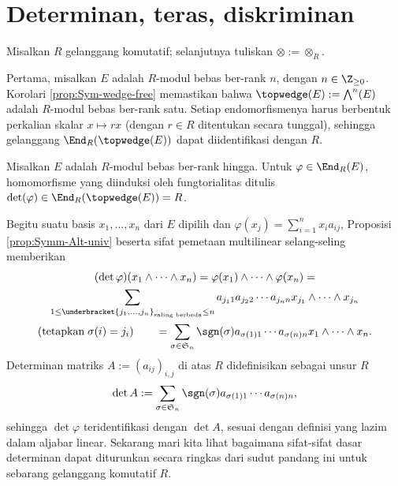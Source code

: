 \section{Determinan, teras, diskriminan}\label{sec:trace-norm-disc}
Misalkan $R$ gelanggang komutatif; selanjutnya tuliskan $\otimes := \otimes_R$.

Pertama, misalkan $E$ adalah $R$-modul bebas ber-rank $n$, dengan $n \in \Z_{\geq 0}$. Korolari \ref{prop:Sym-wedge-free} memastikan bahwa $\topwedge(E) := \bigwedge^n(E)$ adalah $R$-modul bebas ber-rank satu. Setiap endomorfismenya harus berbentuk perkalian skalar $x \mapsto rx$ (dengan $r \in R$ ditentukan secara tunggal), sehingga gelanggang $\End_R(\topwedge(E))$ dapat diidentifikasi dengan $R$. 
\begin{definition}\label{def:general-determinant} 
	Misalkan $E$ adalah $R$-modul bebas ber-rank hingga. Untuk $\varphi \in \End_R(E)$, homomorfisme yang diinduksi oleh fungtorialitas ditulis $\det(\varphi) \in \End_R(\topwedge(E)) = R$.
\end{definition}
Begitu suatu basis $x_1, \ldots, x_n$ dari $E$ dipilih dan $\varphi(x_j) = \sum_{i=1}^n x_i a_{ij}$, Proposisi \ref{prop:Symm-Alt-univ} beserta sifat pemetaan multilinear selang-seling memberikan
\begin{multline}
	(\det\varphi)(x_1 \wedge \cdots \wedge x_n) = \varphi(x_1) \wedge \cdots \wedge \varphi(x_n) = \\
	\sum_{1 \leq \underbracket{j_1, \ldots, j_n}_{\text{saling berbeda}} \leq n} a_{j_1 1} a_{j_2 2} \cdots a_{j_n n} x_{j_1} \wedge \cdots \wedge x_{j_n} \\
	\left( \text{tetapkan}\; \sigma(i) = j_i \right) \qquad = \sum_{\sigma \in \mathfrak{S}_n} \sgn(\sigma) a_{\sigma(1) 1} \cdots a_{\sigma(n) n} x_1 \wedge \cdots \wedge x_n.
\end{multline}
Determinan matriks $A := (a_{ij})_{i,j}$ di atas $R$ didefinisikan sebagai unsur $R$
\begin{gather}\label{eqn:matrix-det}
	\det A := \sum_{\sigma \in \mathfrak{S}_n} \sgn(\sigma) a_{\sigma(1) 1} \cdots a_{\sigma(n) n},
\end{gather}
sehingga $\det \varphi$ teridentifikasi dengan $\det A$, sesuai dengan definisi yang lazim dalam aljabar linear. Sekarang mari kita lihat bagaimana sifat-sifat dasar determinan dapat diturunkan secara ringkas dari sudut pandang ini untuk sebarang gelanggang komutatif $R$.

